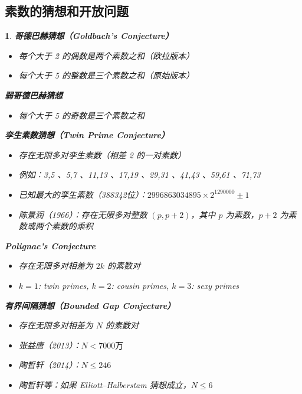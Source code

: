 \documentclass[UTF8]{report}
\theoremstyle{MyLineTheoremStyle} %
\theoremstyle{MyBlockTheoremStyle} %
\theoremstyle{MySubsubsectionStyle} %
\newtheorem{definition}{}
\begin{document}
\subsection{素数的猜想和开放问题}

\begin{definition}

    \textbf{哥德巴赫猜想（Goldbach’s Conjecture）}
    \begin{itemize}
        \item 每个大于 2 的偶数是两个素数之和（欧拉版本）
        \item 每个大于 5 的整数是三个素数之和（原始版本）
    \end{itemize}

    \textbf{弱哥德巴赫猜想}
    \begin{itemize}
        \item 每个大于 5 的奇数是三个素数之和
    \end{itemize}

    \textbf{孪生素数猜想（Twin Prime Conjecture）}
    \begin{itemize}
        \item 存在无限多对孪生素数（相差 2 的一对素数）
        \item 例如：3,5 、5,7 、11,13 、17,19 、29,31 、41,43 、59,61 、71,73
        \item 已知最大的孪生素数（388342位）：$2996863034895 \times 2^{1290000} \pm 1$
        \item 陈景润（1966）：存在无限多对整数 $(p, p + 2)$，其中 $p$ 为素数，$p + 2$ 为素数或两个素数的乘积
    \end{itemize}

    \textbf{Polignac's Conjecture}
    \begin{itemize}
        \item 存在无限多对相差为 $2k$ 的素数对
        \item $k = 1$: twin primes, $k = 2$: cousin primes, $k = 3$: sexy primes
    \end{itemize}

    \textbf{有界间隔猜想（Bounded Gap Conjecture）}
    \begin{itemize}
        \item 存在无限多对相差为 $N$ 的素数对
        \item 张益唐（2013）：$N < 7000\text{万}$
        \item 陶哲轩（2014）：$N \leq 246$
        \item 陶哲轩等：如果 Elliott–Halberstam 猜想成立，$N \leq 6$
    \end{itemize}
\end{definition}
\end{document}
